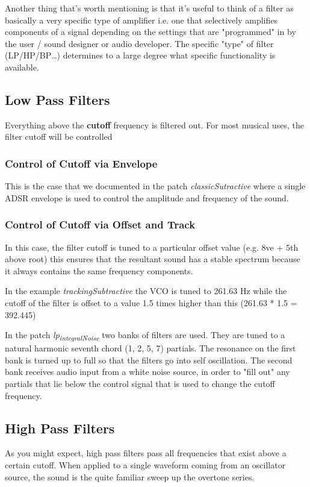\documentclass[11pt]{article}
\begin{document}
Another thing that's worth mentioning is that it's useful to think of
a filter as basically a very specific type of amplifier i.e. one that
selectively amplifies components of a signal depending on the settings
that are "programmed" in by the user / sound designer or audio
developer. The specific "type" of filter (LP/HP/BP\ldots{}) determines to a
large degree what specific functionality is available. 

\subsection{Low Pass Filters}
\label{sec:org1598f14}
Everything above the \textbf{cutoff} frequency is filtered out. For most
musical uses, the filter cutoff will be controlled 

\subsubsection{Control of Cutoff via Envelope}
\label{sec:org35825ba}
This is the case that we documented in the patch \emph{classicSutractive}
where a single ADSR envelope is used to control the amplitude and
frequency of the sound. 

\subsubsection{Control of Cutoff via Offset and Track}
\label{sec:orga074acb}
In this case, the filter cutoff is tuned to a particular offset
value (e.g. 8ve + 5th above root) this ensures that the resultant
sound has a stable spectrum because it always contains the same
frequency components. 

In the example \emph{trackingSubtractive} the VCO is tuned to  261.63 Hz
while the cutoff of the filter is offset to a value 1.5 times higher
than this (261.63 * 1.5 = 392.445)

In the patch \emph{lp\textsubscript{integralNoise}} two banks of filters are used. They are
tuned to a natural harmonic seventh chord (1, 2, 5, 7) partials. The
resonance on the first bank is turned up to full so that the filters
go into self oscillation. The second bank receives audio input from a
white noise source, in order to "fill out" any partials that lie below
the control signal that is used to change the cutoff frequency.

\subsection{High Pass Filters}
\label{sec:org28896f6}
As you might expect, high pass filters pass all frequencies that exist
above a certain cutoff. When applied to a single waveform coming from
an oscillator source, the sound is the quite familiar sweep up the
overtone series. 
\end{document}
